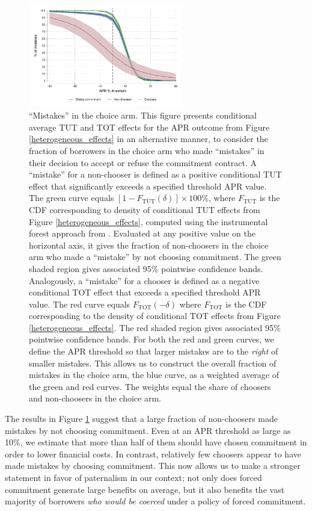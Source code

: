 \documentclass[ecta,nameyear,final]{econsocart}
\begin{document}
\begin{figure}[H]
        \centering
        \includegraphics[width=0.6\textwidth]{Figuras/line_cw_apr_tot_tut.pdf}
 \caption{``Mistakes'' in the choice arm. This figure presents conditional average TUT and TOT effects for the APR outcome from Figure \ref{heterogeneous_effects} in an alternative manner, to consider the fraction of borrowers in the choice arm who made ``mistakes'' in their decision to accept or refuse the commitment contract. A ``mistake'' for a non-chooser is defined as a positive conditional TUT effect that significantly exceeds a specified threshold APR value.
 The green curve equals $[1 - F_{\text{TUT}}(\delta)]\times 100\%$, where $F_{\text{TUT}}$ is the CDF corresponding to density of conditional TUT effects from Figure \ref{heterogeneous_effects}, computed using the instrumental forest approach from \cite{atheygrf}. Evaluated at any positive value on the horizontal axis, it gives the fraction of non-choosers in the choice arm who made a ``mistake'' by not choosing commitment. The green shaded region gives associated 95\% pointwise confidence bands. 
Analogously, a ``mistake'' for a chooser is defined as a negative conditional TOT effect that exceeds a specified threshold APR value. The red curve equals $F_{\text{TOT}}(-\delta)$ where $F_{\text{TOT}}$ is the CDF corresponding to the density of conditional TOT effects from Figure \ref{heterogeneous_effects}. 
The red shaded region gives associated 95\% pointwise confidence bands.
For both the red and green curves, we define the APR threshold so that larger mistakes are to the \emph{right} of smaller mistakes.
This allows us to construct the overall fraction of mistakes in the choice arm, the blue curve, as a weighted average of the green and red curves.
The weights equal the share of choosers and non-choosers in the choice arm.}
    \label{choose_wrong}
\end{figure}

The results in Figure \ref{choose_wrong} suggest that a large fraction of non-choosers made mistakes by not choosing commitment.
Even at an APR threshold as large as 10\%, we estimate that more than half of them should have chosen commitment in order to lower financial costs.
In contrast, relatively few choosers appear to have made mistakes by choosing commitment.
This now allows us to make a stronger statement in favor of paternalism in our context; not only does forced commitment generate large benefits on average, but it also benefits the vast majority of borrowers \emph{who would be coerced} under a policy of forced commitment.
\end{document}
